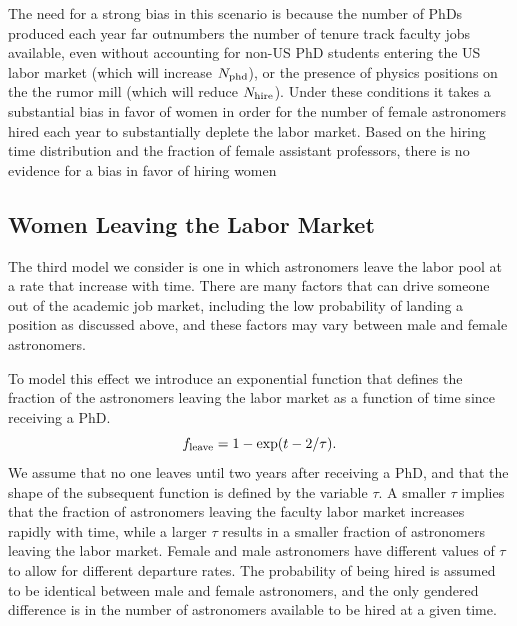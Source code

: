 \documentclass[modern]{aastex62}
\begin{document}
The need for a strong bias in this scenario is because the number of PhDs produced each year far outnumbers the number of tenure track faculty jobs available, even without accounting for non-US PhD students entering the US labor market (which will increase $N_{\rm phd}$), or the presence of physics positions on the the rumor mill (which will reduce $N_{\rm hire}$). Under these conditions it takes a substantial bias in favor of women in order for the number of female astronomers hired each year to substantially deplete the labor market. Based on the hiring time distribution and the fraction of female assistant professors, there is no evidence for a bias in favor of hiring women 

\subsection{Women Leaving the Labor Market}
The third model we consider is one in which astronomers leave the labor pool at a rate that increase with time. There are many factors that can drive someone out of the academic job market, including the low probability of landing a position as discussed above, and these factors may vary between male and female astronomers.

To model this effect we introduce an exponential function that defines the fraction of the astronomers leaving the labor market as a function of time since receiving a PhD.
\begin{equation}
f_{\rm leave} = 1-\exp (t-2/\tau).
\end{equation}
We assume that no one leaves until two years after receiving a PhD, and that the shape of the subsequent function is defined by the variable $\tau$. A smaller $\tau$ implies that the fraction of astronomers leaving the faculty labor market increases rapidly with time, while a larger $\tau$ results in a smaller fraction of astronomers leaving the labor market. Female and male astronomers have different values of $\tau$ to allow for different departure rates. The probability of being hired is assumed to be identical between male and female astronomers, and the only gendered difference is in the number of astronomers available to be hired at a given time. 
\end{document}
